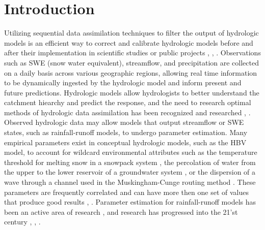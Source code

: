 \chapter{Introduction}



	Utilizing sequential data assimilation techniques to filter the output of hydrologic models is an efficient way to correct and calibrate hydrologic models before and after their implementation in scientific studies or public projects \cite{Reichle2002}, \cite{Moradkhani2005}, \cite{Reichle2008}. Observations such as SWE (snow water equivalent), streamflow, and precipitation are collected on a daily basis across various geographic regions, allowing  real time information to be dynamically ingested by the hydrologic model and inform present and future predictions. Hydrologic models allow hydrologists to better understand the catchment hiearchy and predict the response, and the need to research optimal methods of hydrologic data assimilation has been recognized \cite{Troch2003} and researched \cite{Liu2007}, \cite{Reichle2008}. Observed hydrologic data may allow models that output streamflow or SWE states, such as rainfall-runoff models, to undergo parameter estimation. Many empirical parameters exist in conceptual hydrologic models, such as the HBV model, to account for wildcard environmental attributes such as the temperature threshold for melting snow in a snowpack system \cite{Maneta2008}, the percolation of water from the upper to the lower reservoir of a groundwater system \cite{Maneta2008}, or the dispersion of a wave through a channel used in the Muskingham-Cunge routing method \cite{Montero2016}. These parameters are frequently correlated and can have more then one set of values that produce good results \cite{Jakeman1993}, \cite{Maneta2008}. Parameter estimation for rainfall-runoff models has been an active area of research \cite{Sorooshian1980},\cite{Sorooshian1993} and research has progressed into the 21'st century \cite{Moradkhani2005}, \cite{Wagener2006}, \cite{Reichle2008}.
	
